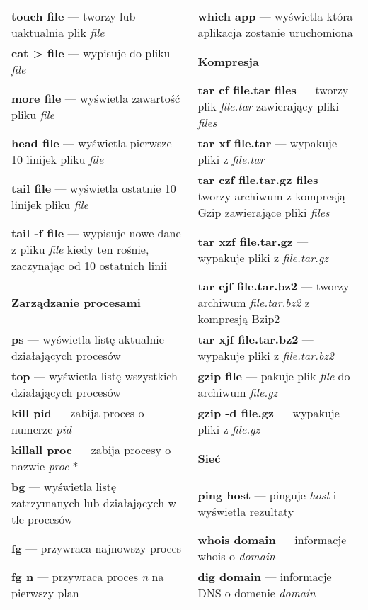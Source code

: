 \begin{tabularx}{\linewidth}{p{8.5cm}|p{8.5cm}}
\textbf{touch file} --- tworzy lub uaktualnia plik \textit{file} & \textbf{which app} --- wyświetla która aplikacja zostanie uruchomiona\\
\textbf{cat > file} --- wypisuje do pliku \textit{file} & \cellcolor[gray]{0.90}\textbf{\textcolor{ubuntu_orange}{Kompresja}}\\
\textbf{more file} --- wyświetla zawartość pliku \textit{file} & \textbf{tar cf file.tar files} --- tworzy plik \textit{file.tar} zawierający pliki \textit{files}\\
\textbf{head file} --- wyświetla pierwsze 10 linijek pliku \textit{file} & \textbf{tar xf file.tar} --- wypakuje pliki z \textit{file.tar}\\
\textbf{tail file} --- wyświetla ostatnie 10 linijek pliku \textit{file} & \textbf{tar czf file.tar.gz files} --- tworzy archiwum z kompresją Gzip zawierające pliki \textit{files}\\
\textbf{tail -f file} --- wypisuje nowe dane z pliku \textit{file} kiedy ten rośnie, zaczynając od 10 ostatnich linii & \textbf{tar xzf file.tar.gz} --- wypakuje pliki z \textit{file.tar.gz} \\
\cellcolor[gray]{0.90}\textbf{\textcolor{ubuntu_orange}{Zarządzanie procesami}} & \textbf{tar cjf file.tar.bz2} --- tworzy archiwum \textit{file.tar.bz2} z kompresją Bzip2\\
\textbf{ps} --- wyświetla listę aktualnie działających procesów & \textbf{tar xjf file.tar.bz2} --- wypakuje pliki z \textit{file.tar.bz2}\\
\textbf{top} --- wyświetla listę wszystkich działających procesów & \textbf{gzip file} --- pakuje plik \textit{file} do archiwum \textit{file.gz}\\
\textbf{kill pid} --- zabija proces o numerze \textit{pid} & \textbf{gzip -d file.gz} --- wypakuje pliki z \textit{file.gz}\\
\textbf{killall proc} --- zabija procesy o nazwie \textit{proc} * & \cellcolor[gray]{0.90}\textbf{\textcolor{ubuntu_orange}{Sieć}}\\
\textbf{bg} --- wyświetla listę zatrzymanych lub działających w tle procesów & \textbf{ping host} --- pinguje \textit{host} i wyświetla rezultaty\\
\textbf{fg} --- przywraca najnowszy proces & \textbf{whois domain} --- informacje whois o \textit{domain}\\
\textbf{fg n} --- przywraca proces \textit{n} na pierwszy plan & \textbf{dig domain} --- informacje DNS o domenie \textit{domain}\\

\end{tabularx}
